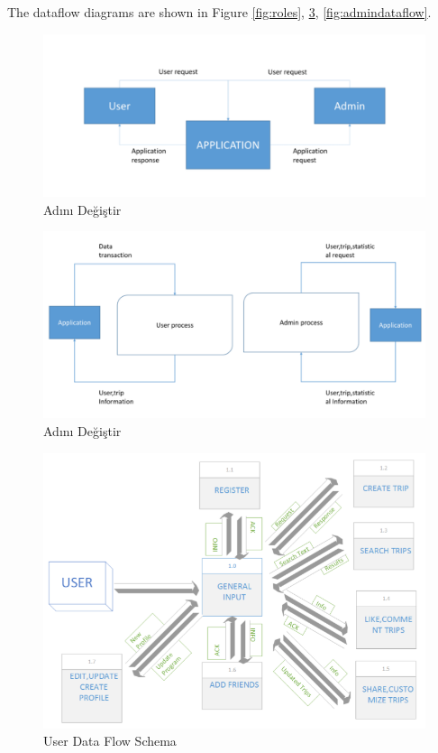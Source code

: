 The dataflow diagrams are shown in Figure \ref{fig:roles}, \ref{fig:userdataflow}, \ref{fig:admindataflow}.


\begin{figure}[!htbp]
\centering
\includegraphics[width=\textwidth]{projectChapters/images/dataflow.png}
\caption{Adını Değiştir}
\label{fig:dataflow}
\end{figure}

\begin{figure}[!htbp]
\centering
\includegraphics[width=\textwidth]{projectChapters/images/dataflow2.png}
\caption{Adını Değiştir}
\label{fig:dataflow2}
\end{figure}

\begin{figure}[!htbp]
\centering
\includegraphics[width=\textwidth]{projectChapters/images/dataflow3.png}
\caption{User Data Flow Schema}
\label{fig:userdataflow}
\end{figure}

